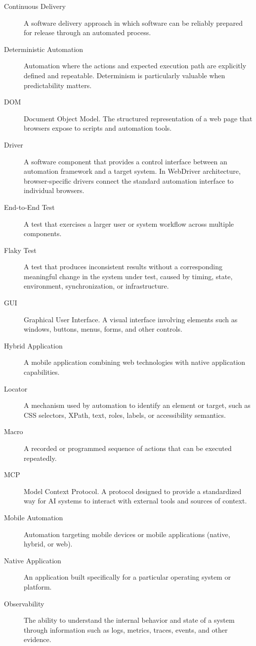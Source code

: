 \documentclass[11pt,twoside]{book}
\begin{document}
\begin{description}
    \item[Continuous Delivery] A software delivery approach in which software can be reliably prepared for release through an automated process.
    \item[Deterministic Automation] Automation where the actions and expected execution path are explicitly defined and repeatable. Determinism is particularly valuable when predictability matters.
    \item[DOM] Document Object Model. The structured representation of a web page that browsers expose to scripts and automation tools.
    \item[Driver] A software component that provides a control interface between an automation framework and a target system. In WebDriver architecture, browser-specific drivers connect the standard automation interface to individual browsers.
    \item[End-to-End Test] A test that exercises a larger user or system workflow across multiple components.
    \item[Flaky Test] A test that produces inconsistent results without a corresponding meaningful change in the system under test, caused by timing, state, environment, synchronization, or infrastructure.
    \item[GUI] Graphical User Interface. A visual interface involving elements such as windows, buttons, menus, forms, and other controls.
    \item[Hybrid Application] A mobile application combining web technologies with native application capabilities.
    \item[Locator] A mechanism used by automation to identify an element or target, such as CSS selectors, XPath, text, roles, labels, or accessibility semantics.
    \item[Macro] A recorded or programmed sequence of actions that can be executed repeatedly.
    \item[MCP] Model Context Protocol. A protocol designed to provide a standardized way for AI systems to interact with external tools and sources of context.
    \item[Mobile Automation] Automation targeting mobile devices or mobile applications (native, hybrid, or web).
    \item[Native Application] An application built specifically for a particular operating system or platform.
    \item[Observability] The ability to understand the internal behavior and state of a system through information such as logs, metrics, traces, events, and other evidence.

\end{description}
\end{document}
